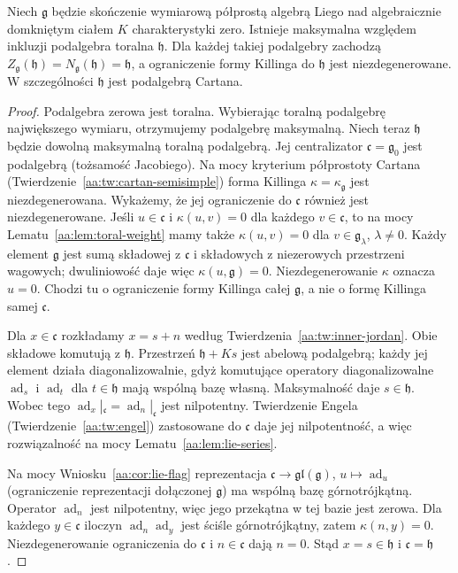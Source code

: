 \begin{twierdzenie}
\label{aa:tw:maximal-toral-cartan}
Niech $\mathfrak g$ będzie skończenie wymiarową półprostą algebrą Liego nad algebraicznie domkniętym ciałem $K$ charakterystyki zero. Istnieje maksymalna względem inkluzji podalgebra toralna $\mathfrak h$. Dla każdej takiej podalgebry zachodzą
$Z_{\mathfrak g}(\mathfrak h)=N_{\mathfrak g}(\mathfrak h)=\mathfrak h$, a ograniczenie formy Killinga do $\mathfrak h$ jest niezdegenerowane. W szczególności $\mathfrak h$ jest podalgebrą Cartana.
\end{twierdzenie}
\begin{proof}
Podalgebra zerowa jest toralna. Wybierając toralną podalgebrę największego wymiaru, otrzymujemy podalgebrę maksymalną. Niech teraz $\mathfrak h$ będzie dowolną maksymalną toralną podalgebrą. Jej centralizator $\mathfrak c=\mathfrak g_0$ jest podalgebrą (tożsamość Jacobiego). Na mocy kryterium półprostoty Cartana (Twierdzenie~\ref{aa:tw:cartan-semisimple}) forma Killinga $\kappa=\kappa_{\mathfrak g}$ jest niezdegenerowana. Wykażemy, że jej ograniczenie do $\mathfrak c$ również jest niezdegenerowane. Jeśli $u\in\mathfrak c$ i $\kappa(u,v)=0$ dla każdego $v\in\mathfrak c$, to na mocy Lematu~\ref{aa:lem:toral-weight} mamy także $\kappa(u,v)=0$ dla $v\in\mathfrak g_\lambda$, $\lambda\ne0$. Każdy element $\mathfrak g$ jest sumą składowej z $\mathfrak c$ i składowych z niezerowych przestrzeni wagowych; dwuliniowość daje więc $\kappa(u,\mathfrak g)=0$. Niezdegenerowanie $\kappa$ oznacza $u=0$. Chodzi tu o ograniczenie formy Killinga całej $\mathfrak g$, a nie o formę Killinga samej $\mathfrak c$.

Dla $x\in\mathfrak c$ rozkładamy $x=s+n$ według Twierdzenia~\ref{aa:tw:inner-jordan}. Obie składowe komutują z $\mathfrak h$. Przestrzeń $\mathfrak h+Ks$ jest abelową podalgebrą; każdy jej element działa diagonalizowalnie, gdyż komutujące operatory diagonalizowalne $\operatorname{ad}_s$ i $\operatorname{ad}_t$ dla $t\in\mathfrak h$ mają wspólną bazę własną. Maksymalność daje $s\in\mathfrak h$. Wobec tego $\operatorname{ad}_x|_{\mathfrak c}=\operatorname{ad}_n|_{\mathfrak c}$ jest nilpotentny. Twierdzenie Engela (Twierdzenie~\ref{aa:tw:engel}) zastosowane do $\mathfrak c$ daje jej nilpotentność, a więc rozwiązalność na mocy Lematu~\ref{aa:lem:lie-series}.

Na mocy Wniosku~\ref{aa:cor:lie-flag} reprezentacja $\mathfrak c\to\mathfrak{gl}(\mathfrak g)$, $u\mapsto\operatorname{ad}_u$ (ograniczenie reprezentacji dołączonej $\mathfrak g$) ma wspólną bazę górnotrójkątną. Operator $\operatorname{ad}_n$ jest nilpotentny, więc jego przekątna w tej bazie jest zerowa. Dla każdego $y\in\mathfrak c$ iloczyn $\operatorname{ad}_n\operatorname{ad}_y$ jest ściśle górnotrójkątny, zatem $\kappa(n,y)=0$. Niezdegenerowanie ograniczenia do $\mathfrak c$ i $n\in\mathfrak c$ dają $n=0$. Stąd $x=s\in\mathfrak h$ i $\mathfrak c=\mathfrak h$.


\end{proof}

